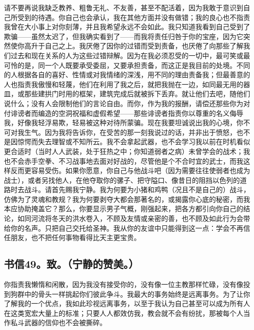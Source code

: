 请不要再说我缺乏教养、粗鲁无礼、不友善，甚至不配活着，因为我敢于意识到自己所受到的待遇。你自己也会承认，我在其他方面并没有做错；我的良心也不指责我曾在大小事上对你刻薄，并且我希望永远不会如此。我只知道我看到自己受到了欺骗——虽然太迟了，但我确实看到了——而我将责任归咎于你的宝座，因为它突然使你高升于自己之上。我厌倦了因你的过错而受到责备，也厌倦了向那些了解我们过去和现在关系的人为这些过错辩解。因为在我必须忍受的一切中，最可笑或最可怜的是，同一个人既要承受委屈，又要承担责备，而这正是我目前的处境。不同的人根据各自的喜好、性情或对我情绪的深浅，用不同的理由责备我；但最善意的人也指责我傲慢和轻蔑，他们在利用了我之后，就把我抛在一边，如同最无用的器皿，或那些建拱门时用的框架，建筑完成后就被拆下丢弃。就让他们去吧，随他们说什么；没有人会限制他们的言论自由。而你，作为我的报酬，请偿还那些你为对付诽谤者而编造的空洞祝福和虚假希望——那些诽谤者指责你以尊重的名义侮辱我，好像我轻浮易欺，轻易被这种对待所蒙骗。现在我要坦诚说出我的心境，你不可对我生气。因为我将告诉你，在受苦的那一刻我说过的话，并非出于愤怒，也不是因惊愕而失去理智或不知所云。我不会拿起武器，也不会学习我以前在时机看似更合适时（当时人人武装，处于狂热之中；你知道弱者之病）未曾学会的战术；我也不会赤手空拳、不习战事地去面对好战的，尽管他是个不合时宜的武士，而我这样反而更容易受伤。如果你愿意，你自己与他战斗吧（因为需要往往使弱者也成为战士），或者另找他人，在他夺取你的骡子、把守隘口、像昔日的阻挡以色列的道路时去战斗。请首先赐我宁静。我为何要为小猪和鸡鸭（况且不是自己的）战斗，仿佛为了灵魂和教规？我为何要剥夺大都会那著名的，或揭露你心底的秘密，而我本应协助掩盖它？那么，你要显示男子气概，刚强起来，把各方都引向你自己的结论，如同河流将冬天的洪水卷入，不顾及友情或亲密的善，也不顾及如此行为会带给你的名声。只把自己交托给圣神。我从你的友谊中只能得到这一点：学会不再信任朋友，也不把任何事物看得比天主更宝贵。\par


\subsection{书信49。致。（宁静的赞美。）}

你指责我懒惰和闲散，因为我没有接受你的，没有像一位主教那样忙碌，没有像投到狗群中的骨头一样挑起你们彼此争斗。我最大的事务始终是远离事务。为了让你了解我的一个优点，我如此珍视远离事务，以至于我认为自己甚至可以成为所有人在这类宽宏大量上的标准；只要人人都效仿我，教会就不会有纷扰，那被每个人当作私斗武器的信仰也不会被撕碎。\par

